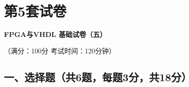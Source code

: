 \chapter{第5套试卷}

\begin{center}
\textbf{FPGA与VHDL 基础试卷（五）}

（满分：100分 \hspace{2em} 考试时间：120分钟）
\end{center}

\section{一、选择题（共6题，每题3分，共18分）}

